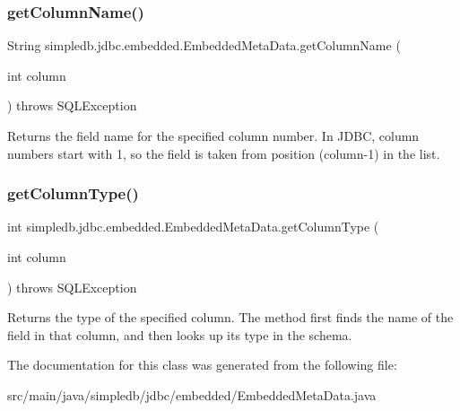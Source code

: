 \subsubsection{\texorpdfstring{get\+Column\+Name()}{getColumnName()}}
{\footnotesize\ttfamily String simpledb.\+jdbc.\+embedded.\+Embedded\+Meta\+Data.\+get\+Column\+Name (\begin{DoxyParamCaption}\item[{int}]{column }\end{DoxyParamCaption}) throws S\+Q\+L\+Exception\hspace{0.3cm}{\ttfamily [inline]}}

Returns the field name for the specified column number. In J\+D\+BC, column numbers start with 1, so the field is taken from position (column-\/1) in the list. \mbox{\label{classsimpledb_1_1jdbc_1_1embedded_1_1EmbeddedMetaData_a2b5e8a6fa3cc530acce45e1399c903c5}} 
\subsubsection{\texorpdfstring{get\+Column\+Type()}{getColumnType()}}
{\footnotesize\ttfamily int simpledb.\+jdbc.\+embedded.\+Embedded\+Meta\+Data.\+get\+Column\+Type (\begin{DoxyParamCaption}\item[{int}]{column }\end{DoxyParamCaption}) throws S\+Q\+L\+Exception\hspace{0.3cm}{\ttfamily [inline]}}

Returns the type of the specified column. The method first finds the name of the field in that column, and then looks up its type in the schema. 

The documentation for this class was generated from the following file\+:\begin{DoxyCompactItemize}
\item 
src/main/java/simpledb/jdbc/embedded/Embedded\+Meta\+Data.\+java\end{DoxyCompactItemize}
